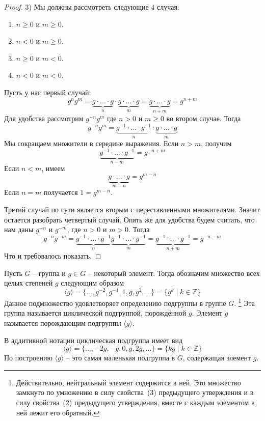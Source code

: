 \begin{proof}
3) Мы должны рассмотреть следующие $4$ случая:
\begin{enumerate}
\item $n\geqslant 0$ и $m\geqslant 0$.

\item $n < 0$ и $m\geqslant 0$.

\item $n\geqslant 0$ и $m < 0$.

\item $n < 0$ и $m < 0$.
\end{enumerate}
Пусть у нас первый случай:
\[
g^n g^m = \underbrace{g\cdot \ldots \cdot g}_n\cdot\underbrace{g\cdot \ldots \cdot g}_m = \underbrace{g\cdot \ldots \cdot g}_{n+m} = g^{n+m}
\]
Для удобства рассмотрим $g^{-n} g^{m}$ где $n>0$ и $m\geqslant 0$ во втором случае.
Тогда
\[
g^{-n}g^{m} = \underbrace{g^{-1}\cdot \ldots \cdot g^{-1}}_{n}\cdot\underbrace{g\cdot \ldots \cdot g}_m
\]
Мы сокращаем множители в середине выражения.
Если $n >m$, получим
\[
\underbrace{g^{-1}\cdot \ldots \cdot g^{-1}}_{n - m} = g^{-n + m}
\]
Если $n < m$, имеем
\[
\underbrace{g\cdot \ldots \cdot g}_{m - n} = g^{m - n}
\]
Если $n = m$ получается $1 = g^{m - n}$.

Третий случай по сути является вторым с переставленными множителями.
Значит остается разобрать четвертый случай.
Опять же для удобства будем считать, что нам даны $g^{-n}$ и $g^{-m}$, где $n>0$ и $m > 0$.
Тогда
\[
g^{-n} g^{-m} = \underbrace{g^{-1}\cdot \ldots \cdot g^{-1}}_{n}\underbrace{g^{-1}\cdot \ldots \cdot g^{-1}}_{m} = \underbrace{g^{-1}\cdot \ldots \cdot g^{-1}}_{n + m} = g^{-n - m}
\]
Что и требовалось показать.
\end{proof}


\begin{definition}
Пусть $G$ -- группа и $g\in G$ -- некоторый элемент.
Тогда обозначим множество всех целых степеней $g$ следующим образом
\[
\langle g \rangle = \{ \ldots, g^{-2},g^{-1},1, g, g^2, \ldots\} = \{g^k \mid k\in \mathbb Z\}
\]
Данное подмножество удовлетворяет определению подгруппы в группе $G$.%
\footnote{Действительно, нейтральный элемент содержится в ней.
Это множество замкнуто по умножению в силу свойства~(3) предыдущего утверждения и в силу свойства~(2) предыдущего утверждения, вместе с каждым элементом в ней лежит его обратный.}
Эта группа называется циклической подгруппой, порождённой $g$.
Элемент $g$ называется порождающим подгруппы $\langle g\rangle$.
\end{definition}

В аддитивной нотации циклическая подгруппа имеет вид
\[
\langle g\rangle = \{\ldots, -2 g, - g , 0, g, 2g, \ldots\} = \{kg\mid k \in \mathbb Z\}
\]
По построению $\langle g\rangle$ -- это самая маленькая подгруппа в $G$, содержащая элемент $g$.



